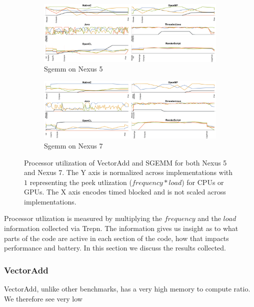 \begin{figure}[ht]
  \begin{subfigure}[b]{0.9\textwidth}
       \centering
       \includegraphics[width=\textwidth]{data/load_sgemm_nexus5.pdf}
       \caption{Sgemm on Nexus 5}\label{fig:Sgemm5}
   \end{subfigure}
  \begin{subfigure}[b]{0.9\textwidth}
       \centering
       \includegraphics[width=\textwidth]{data/load_sgemm_nexus7.pdf}
       \caption{Sgemm on Nexus 7}\label{fig:Sgemm7}
   \end{subfigure}


  \caption{Processor utilization of VectorAdd and SGEMM for both Nexus 5 and Nexus 7. The Y axis is normalized across implementations with $1$ representing the peek utlization ($frequency*load$) for CPUs or GPUs. The X axis encodes timed blocked and is not scaled across implementations.}
\end{figure}
\FloatBarrier

Processor utlization is measured by multiplying the $frequency$ and the $load$ information collected via Trepn.
The information gives us insight as to what parts of the code are active in each
	section of the code, how that impacts performance and battery.
In this section we discuss the results collected.

\subsubsection{VectorAdd}

VectorAdd, unlike other benchmarks, has a very high memory to compute ratio.
We therefore see very low 

